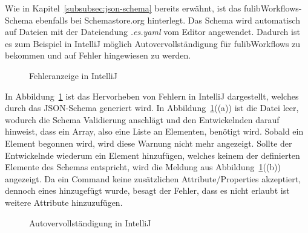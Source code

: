 Wie in Kapitel~\ref{subsubsec:json-schema} bereits erwähnt, ist das fulibWorkflows-Schema ebenfalls bei Schemastore.org hinterlegt.
Das Schema wird automatisch auf Dateien mit der Dateiendung \textit{.es.yaml} vom Editor angewendet.
Dadurch ist es zum Beispiel in IntelliJ möglich Autovervollständigung für fulibWorkflows zu bekommen und auf Fehler hingewiesen zu werden.

\begin{figure}%
    \centering
    \qquad
    \caption{Fehleranzeige in IntelliJ}%
    \label{fig:errors-schema}%
\end{figure}

In Abbildung~\ref{fig:errors-schema} ist das Hervorheben von Fehlern in IntelliJ dargestellt, welches durch das JSON-Schema generiert wird.
In Abbildung~\ref{fig:errors-schema}((a)) ist die Datei leer, wodurch die Schema Validierung anschlägt und den Entwickelnden darauf hinweist, dass ein Array, also eine Liste an Elementen, benötigt wird.
Sobald ein Element begonnen wird, wird diese Warnung nicht mehr angezeigt.
Sollte der Entwickelnde wiederum ein Element hinzufügen, welches keinem der definierten Elemente des Schemas entspricht, wird die Meldung aus Abbildung~\ref{fig:errors-schema}((b)) angezeigt.
Da ein Command keine zusätzlichen Attribute/Properties akzeptiert, dennoch eines hinzugefügt wurde, besagt der Fehler, dass es nicht erlaubt ist weitere Attribute hinzuzufügen.

\begin{figure}%
    \centering
    \qquad
    \caption{Autovervollständigung in IntelliJ}%
    \label{fig:completion-schema}%
\end{figure}

